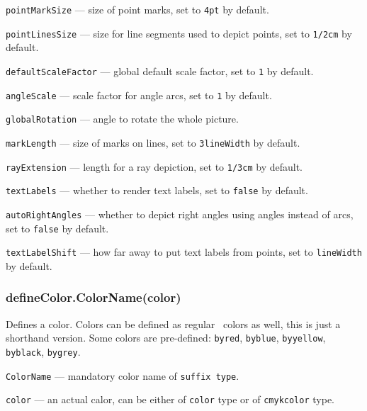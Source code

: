 \documentclass{ltxdoc}
\begin{document}
	\texttt{pointMarkSize} — size of point marks, set to \texttt{4pt} by default.
	
	\texttt{pointLinesSize} — size for line segments used to depict points, set to \texttt{1/2cm} by default.

	\texttt{defaultScaleFactor} — global default scale factor, set to \texttt{1} by default.
	
	\texttt{angleScale} — scale factor for angle arcs, set to \texttt{1} by default.

	\texttt{globalRotation} — angle to rotate the whole picture.

	\texttt{markLength} — size of marks on lines, set to \texttt{3lineWidth} by default.

	\texttt{rayExtension} — length for a ray depiction, set to \texttt{1/3cm} by default.

	
	\texttt{textLabels} — whether to render text labels, set to \texttt{false} by default.


	\texttt{autoRightAngles} — whether to depict right angles using angles instead of arcs, set to \texttt{false} by default.

	
	\texttt{textLabelShift} — how far away to put text labels from points, set to \texttt{lineWidth} by default.
	


\subsubsection{defineColor.ColorName(color)}\label{defineColor}
	
	Defines a color. Colors can be defined as regular \METAPOST\ colors as well, this is just a shorthand version. Some colors are pre-defined: \texttt{byred}, \texttt{byblue}, \texttt{byyellow}, \texttt{byblack}, \texttt{bygrey}.

	\texttt{ColorName} — mandatory color name of \texttt{suffix type}.
	
	\texttt{color} — an actual calor, can be either of \texttt{color} type or of \texttt{cmykcolor} type.

	
\end{document}
